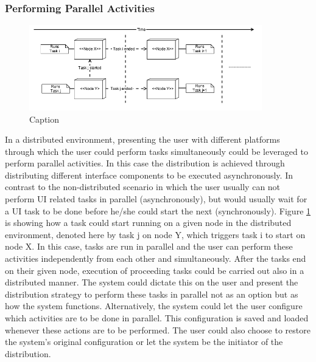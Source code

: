 \subsubsection{Performing Parallel Activities}
\begin{figure}[h]
\includegraphics[width=0.9\textwidth, inner, center]{figures/generic2}
\caption{Caption}
\label{fig:figure32}
\end{figure}
In a distributed environment, presenting the user with different platforms through which the user could perform tasks simultaneously could be leveraged to perform parallel activities. In this case the distribution is achieved through distributing different interface components to be executed asynchronously. In contrast to the non-distributed scenario in which the user usually can not perform UI related tasks in parallel (asynchronously), but would usually wait for a UI task to be done before he/she could start the next (synchronously). Figure \ref{fig:figure32} is showing how a task could start running on a given node in the distributed environment, denoted here by task j on node Y, which triggers task i to start on node X. In this case, tasks are run in parallel and the user can perform these activities independently from each other and simultaneously. After the tasks end on their given node, execution of proceeding tasks could be carried out also in a distributed manner. 
The system could dictate this on the user and present the distribution strategy to perform these tasks in parallel not as an option but as how the system functions. Alternatively, the system could let the user configure which activities are to be done in parallel. This configuration is saved and loaded whenever these actions are to be performed. The user could also choose to restore the system's original configuration or let the system be the initiator of the distribution.
    

